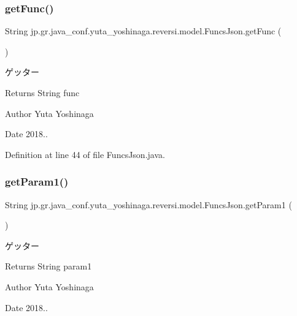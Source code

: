 \subsubsection{\texorpdfstring{get\+Func()}{getFunc()}}
{\footnotesize\ttfamily String jp.\+gr.\+java\+\_\+conf.\+yuta\+\_\+yoshinaga.\+reversi.\+model.\+Funcs\+Json.\+get\+Func (\begin{DoxyParamCaption}{ }\end{DoxyParamCaption})}



ゲッター 

\begin{DoxyReturn}{Returns}
String func 
\end{DoxyReturn}
\begin{DoxyAuthor}{Author}
Yuta Yoshinaga 
\end{DoxyAuthor}
\begin{DoxyDate}{Date}
2018.. 
\end{DoxyDate}


Definition at line 44 of file Funcs\+Json.\+java.

\mbox{\label{classjp_1_1gr_1_1java__conf_1_1yuta__yoshinaga_1_1reversi_1_1model_1_1_funcs_json_a17ed3cd16403a8b83b61fa069556c68e}} 
\subsubsection{\texorpdfstring{get\+Param1()}{getParam1()}}
{\footnotesize\ttfamily String jp.\+gr.\+java\+\_\+conf.\+yuta\+\_\+yoshinaga.\+reversi.\+model.\+Funcs\+Json.\+get\+Param1 (\begin{DoxyParamCaption}{ }\end{DoxyParamCaption})}



ゲッター 

\begin{DoxyReturn}{Returns}
String param1 
\end{DoxyReturn}
\begin{DoxyAuthor}{Author}
Yuta Yoshinaga 
\end{DoxyAuthor}
\begin{DoxyDate}{Date}
2018.. 
\end{DoxyDate}



